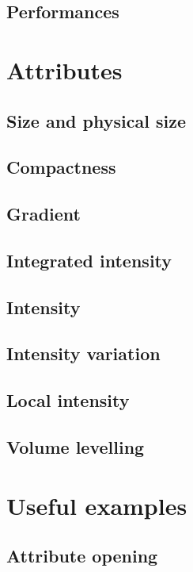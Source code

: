 \documentclass{InsightArticle}
\begin{document}
  \subsection{Performances}

\section{Attributes}

  \subsection{Size and physical size}

  \subsection{Compactness}

  \subsection{Gradient}

  \subsection{Integrated intensity}

  \subsection{Intensity}

  \subsection{Intensity variation}

  \subsection{Local intensity}

  \subsection{Volume levelling}

\section{Useful examples}

  \subsection{Attribute opening}
\end{document}

